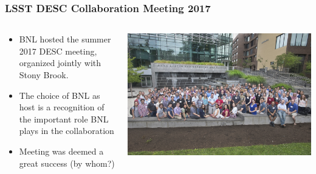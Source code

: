 \documentclass[aspectratio=169]{beamer}
\begin{document}
\begin{frame}
  \frametitle{LSST DESC Collaboration Meeting 2017 }
  
  \begin{columns}
    \begin{column}{0.4\textwidth}
      \begin{itemize}
    \item BNL hosted the summer 2017 DESC meeting, organized jointly
        with Stony Brook.
      \item The choice of BNL as host is a recognition of the important role
          BNL plays in the collaboration
      \item Meeting was deemed a great success {\color{red} (by whom?)}

      \end{itemize}
    \end{column}
    \begin{column}{0.6\textwidth}
      \includegraphics[width=\linewidth]{./D0680717.jpg}
    \end{column}
  \end{columns}


\end{frame}

{
\frame
{
}
}
\end{document}
